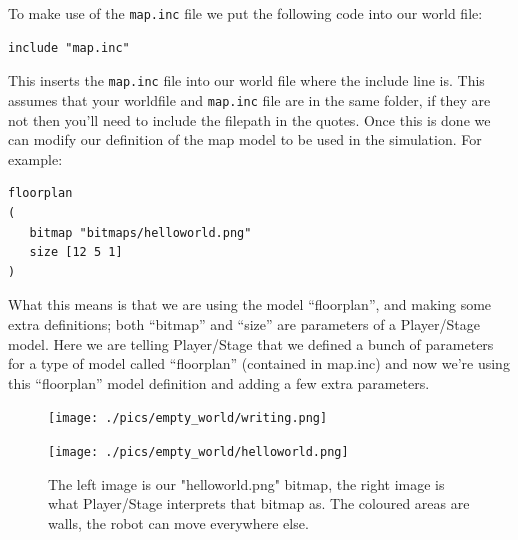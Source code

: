 \documentclass[a4paper]{report}
\newcommand{\plst}{Player/Stage\xspace}
\begin{document}
To make use of the \verb|map.inc| file we put the following code into our world file:
\begin{verbatim}
include "map.inc"
\end{verbatim}
This inserts the \verb|map.inc| file into our world file where the include line is. This assumes that your worldfile and \verb|map.inc| file are in the same folder, if they are not then you'll need to include the filepath in the quotes. Once this is done we can modify our definition of the map model to be used in the simulation. For example:
\begin{verbatim}
floorplan
(
   bitmap "bitmaps/helloworld.png"
   size [12 5 1]	
)
\end{verbatim}
What this means is that we are using the model ``floorplan'', and making some extra definitions; both ``bitmap'' and ``size'' are parameters of a \plst model. Here we are telling \plst that we defined a bunch of parameters for a type of model called ``floorplan'' (contained in map.inc) and now we're using this ``floorplan'' model definition and adding a few extra parameters.

\begin{figure}
	\centering
	\begin{minipage}[c]{0.4\linewidth}
		\centering
		\texttt{[image: ./pics/empty\_world/writing.png]}
		
	\end{minipage}%
	\hspace{0.05\linewidth}
	\begin{minipage}[c]{0.5\linewidth}
		\centering
		\texttt{[image: ./pics/empty\_world/helloworld.png]} 
	\end{minipage}	
	\caption{The left image is our "helloworld.png" bitmap, the right image is what \plst interprets that bitmap as. The coloured areas are walls, the robot can move everywhere else.}
		\label{fig:BuildingAWorld:EmptyWorld:Models:HelloWorld}
\end{figure}
\end{document}
